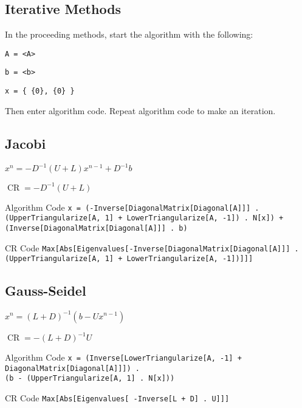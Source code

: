 \documentclass[10pt,letterpaper]{article}
\newenvironment{tight_item}
{\begin{itemize}
\setlength{\parskip}{0pt}
\setlength{\parsep}{0pt}
\setlength{\itemsep}{0pt}
\setlength{\parsep}{0pt}
\setlength{\topsep}{0pt}
\setlength{\partopsep}{0pt}
\setlength{\leftmargin}{0em}
\setlength{\labelwidth}{0em}
\setlength{\labelsep}{1em} }
{\end{itemize}}
\newenvironment{tight_enum}
{\begin{enumerate}
\setlength{\parskip}{0pt}
\setlength{\parsep}{0pt}
\setlength{\itemsep}{0pt}
\setlength{\parsep}{0pt}
\setlength{\topsep}{0pt}
\setlength{\partopsep}{0pt}
\setlength{\leftmargin}{0em}
\setlength{\labelwidth}{0em}
\setlength{\labelsep}{1em} }
{\end{enumerate}}
\newenvironment{tight_desc}
{\begin{description}
\setlength{\parskip}{0pt}
\setlength{\parsep}{0pt}
\setlength{\itemsep}{0pt}
\setlength{\parsep}{0pt}
\setlength{\topsep}{0pt}
\setlength{\partopsep}{0pt}
\setlength{\leftmargin}{0em}
\setlength{\labelwidth}{0em}
\setlength{\labelsep}{1em} }
{\end{description}}
\begin{document}
\begin{multicols*}{2}

\section{Iterative Methods}
In the proceeding methods, start the algorithm with the following:
\begin{tight_enum}
\item \texttt{A = <A>}
\item \texttt{b = <b>}
\item \texttt{x = \{ \{0\}, \{0\} \} }
\end{tight_enum}
Then enter algorithm code. Repeat algorithm code to make an iteration.

\subsection{Jacobi}
\begin{tight_item}
\item $x^{n} = -D^{-1}(U + L)x^{n-1}+ D^{-1}b$
\item $\operatorname{CR} = -D^{-1}(U+L)$
\end{tight_item}
\begin{tight_desc}
\item[Algorithm Code] \texttt{x = (-Inverse[DiagonalMatrix[Diagonal[A]]] .\\(UpperTriangularize[A, 1] + LowerTriangularize[A, -1]) . N[x]) +\\(Inverse[DiagonalMatrix[Diagonal[A]]] . b)}
\item[CR Code] \texttt{Max[Abs[Eigenvalues[-Inverse[DiagonalMatrix[Diagonal[A]]] .\\(UpperTriangularize[A, 1] + LowerTriangularize[A, -1])]]]}
\end{tight_desc}

\subsection{Gauss-Seidel}
\begin{tight_item}
\item $x^{n} = (L+D)^{-1}(b-Ux^{n-1})$
\item $\operatorname{CR} = -(L+D)^{-1}U$
\end{tight_item}
\begin{tight_desc}
\item[Algorithm Code] \texttt{x = (Inverse[LowerTriangularize[A, -1] +\\DiagonalMatrix[Diagonal[A]]]) .\\(b - (UpperTriangularize[A, 1] . N[x]))}
\item[CR Code] \texttt{Max[Abs[Eigenvalues[ -Inverse[L + D] . U]]]}
\end{tight_desc}


\end{multicols*}
\end{document}
